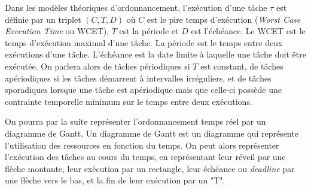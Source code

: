 Dans les modèles théoriques d'ordonnancement, l'exécution d'une tâche $\tau$ est définie par un triplet $(C,T,D)$ où $C$ est le pire temps d'exécution (\textit{Worst Case Execution Time} ou WCET), $T$ est la période et $D$ est l'échéance. Le WCET est le temps d'exécution maximal d'une tâche. La période est le temps entre deux exécutions d'une tâche. L'échéance est la date limite à laquelle une tâche doit être exécutée. On parlera alors de tâches périodiques si $T$ est constant, de tâches apériodiques si les tâches démarrent à intervalles irréguliers, et de tâches sporadiques lorsque une tâche est apériodique mais que celle-ci   possède une contrainte temporelle minimum sur le temps entre deux exécutions.

On pourra par la suite représenter l'ordonnancement temps réel par un diagramme de Gantt. Un diagramme de Gantt est un diagramme qui représente l'utilisation des ressources en fonction du temps. On peut alors représenter l'exécution des tâches au cours du temps, en représentant leur réveil par une flèche montante, leur exécution par un rectangle, leur échéance ou \textit{deadline} par une flèche vers le bas, et la fin de leur exécution par un "T". 

